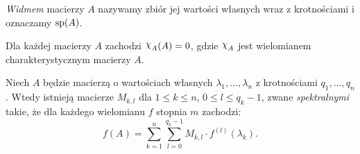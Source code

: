%
\begin{definition}
  \emph{Widmem} macierzy $A$ nazywamy zbiór jej wartości własnych wraz z krotnościami i oznaczamy $\operatorname{sp} (A)$.
\end{definition}
%
\begin{theorem} \label{T: H-C}
  Dla każdej macierzy $A$ zachodzi $\mychi_A(A) = 0$, gdzie $\mychi_A$ jest wielomianem charakterystycznym macierzy $A$.
\end{theorem}
%
\begin{theorem}
  Niech $A$ będzie macierzą o wartościach własnych $\lambda_1,\ldots,\lambda_n$ z krotnościami $q_1,\ldots,q_n$. Wtedy 
  istnieją macierze $M_{k,l}$ dla $1 \leq k \leq n$, $0 \leq l \leq q_k-1$, zwane \emph{spektralnymi} takie, że dla 
  każdego wielomianu $f$ stopnia $m$ zachodzi:
%
  \begin{equation*}
    f(A) = \sum_{k=1}^{n} \sum_{l=0}^{q_k-1} M_{k,l} \cdot f^{(l)}(\lambda_k).
  \end{equation*}
\end{theorem}
%
